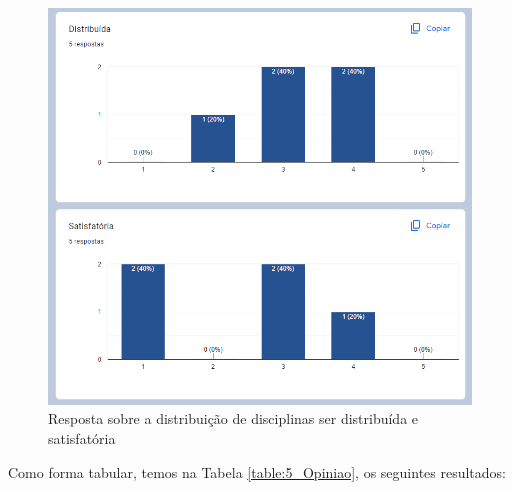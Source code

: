         \begin{figure}[htbp]\centering
            \caption{\label{fig:5.3_Opiniao} Resposta sobre a distribuição de disciplinas ser distribuída e satisfatória}
            \includegraphics[scale=0.8]{files/img/forms/5.3-Opiniao-DistribuidaSatisfatoria.png}
        \end{figure} %

        Como forma tabular, temos na Tabela \ref{table:5_Opiniao}, os seguintes resultados:


